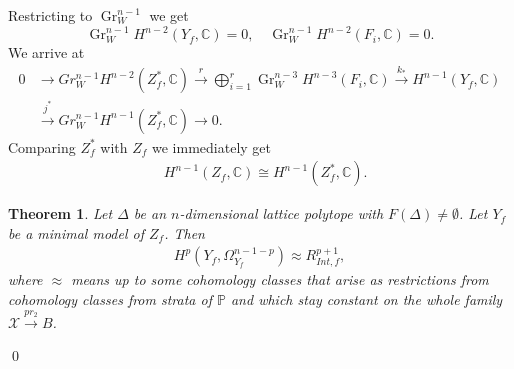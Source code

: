 \documentclass[12pt, english]{article}
\newtheorem{remark}[definition]{Remark}
\newtheorem{theorem}[definition]{Theorem}
\DeclareMathOperator{\Gr}{Gr}
\begin{document}
\leavevmode
\newline

Restricting to $\Gr_W^{n-1}$ we get
\[ \Gr_W^{n-1} H^{n-2}(Y_f,\mathbb{C}) = 0, \quad \Gr_W^{n-1} H^{n-2}(F_i,\mathbb{C}) = 0.  \]
We arrive at
\begin{align}\label{basic_exact_sequence_cohomology_complement}
	0 &\rightarrow Gr_{W}^{n-1}H^{n-2}(Z_f^*,\mathbb{C}) \overset{r}{\rightarrow} \bigoplus\limits_{i = 1}^r  \Gr_W^{n-3} H^{n-3}(F_i, \mathbb{C}) \overset{k_{*}}{\rightarrow} H^{n-1}(Y_f, \mathbb{C}) \\
	& \overset{j^{*}}{\rightarrow} Gr_{W}^{n-1} H^{n-1}(Z_f^*, \mathbb{C}) \rightarrow 0. \nonumber
\end{align}
Comparing $Z_f^*$ with $Z_f$ we immediately get
\begin{align*}
	& H^{n-1}(Z_f, \mathbb{C}) \cong H^{n-1}(Z_f^*,\mathbb{C}).
\end{align*}




\begin{theorem} \label{theorem_Hodge_comp_min_surf_jac_ring}
	Let $\Delta$ be an $n$-dimensional lattice polytope with $F(\Delta) \neq \emptyset$. Let $Y_f$ be a minimal model of $Z_f$. Then
	\begin{align} 
		H^{p}(Y_f,\Omega_{Y_f}^{n-1-p}) \approx R_{Int,f}^{p+1},
	\end{align}
	where $\approx$ means up to some cohomology classes that arise as restrictions from cohomology classes from strata of $\mathbb{P}$ and which stay constant on the whole family $\mathcal{X} \overset{pr_2}{\rightarrow} B$.
\end{theorem}

\qed
\end{document}
